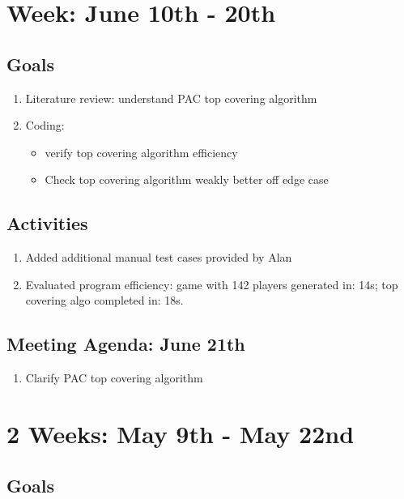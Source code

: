 \documentclass[a4paper]{article}
\begin{document}
\section*{Week: June 10th - 20th}

\subsection*{Goals}

\begin{enumerate}
  \item Literature review: understand PAC top covering algorithm
  \item Coding:
  \begin{itemize}
    \item verify top covering algorithm efficiency
    \item Check top covering algorithm weakly better off edge case
  \end{itemize}
\end{enumerate}

\subsection*{Activities}

\begin{enumerate}
  \item Added additional manual test cases provided by Alan
  \item Evaluated program efficiency: game with 142 players generated in: 14s; top covering algo completed in: 18s.
\end{enumerate}

\subsection*{Meeting Agenda: June 21th}

\begin{enumerate}
  \item Clarify PAC top covering algorithm
\end{enumerate}

\section*{2 Weeks: May 9th - May 22nd}

\subsection*{Goals}
\end{document}
